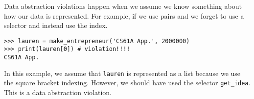 Data abstraction violations happen when we assume we know something about how
our data is represented. For example, if we use pairs and we forget to use a
selector and instead use the index.

\begin{lstlisting}
>>> lauren = make_entrepreneur('CS61A App.', 2000000)
>>> print(lauren[0]) # violation!!!!
CS61A App.
\end{lstlisting}

In this example, we assume that {\tt lauren} is represented as a list because
we use the square bracket indexing. However, we should have used the selector
{\tt get\_idea}. This is a data abstraction violation.
